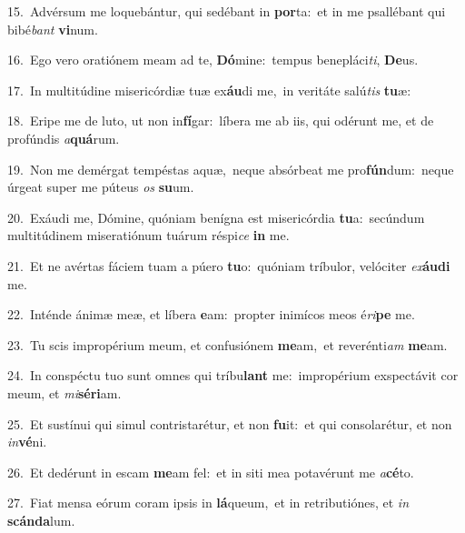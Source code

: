 {\numbfont\textcolor{\numbcolor}{15.}}~Advérsum me loquebántur, qui sedébant in \textbf{por}\-ta:~\star et in me psallébant qui bibé\textit{bant} \textbf{vi}\-num.\par
{\numbfont\textcolor{\numbcolor}{16.}}~Ego vero oratiónem meam ad te, \textbf{Dó}\-mine:~\star tempus benepláci\-\textit{ti}\-, \textbf{De}\-us.\par
{\numbfont\textcolor{\numbcolor}{17.}}~In multitúdine misericórdiæ tuæ ex\-\textbf{áu}\-di me,~\star in veritáte salú\textit{tis} \textbf{tu}\-æ:\par
{\numbfont\textcolor{\numbcolor}{18.}}~Eripe me de luto, ut non in\-\textbf{fí}\-gar:~\star líbera me ab iis, qui odérunt me, et de profúndis \textit{a}\-\textbf{quá}rum.\par
{\numbfont\textcolor{\numbcolor}{19.}}~Non me demérgat tempéstas aquæ,~\dagger neque absórbeat me pro\-\textbf{fún}\-dum:~\star neque úrgeat super me púteus \textit{os} \textbf{su}\-um.\par
{\numbfont\textcolor{\numbcolor}{20.}}~Exáudi me, Dómine, quóniam benígna est misericórdia \textbf{tu}\-a:~\star secúndum multitúdinem miseratiónum tuárum réspi\textit{ce} \textbf{in} me.\par
{\numbfont\textcolor{\numbcolor}{21.}}~Et ne avértas fáciem tuam a púero \textbf{tu}\-o:~\star quóniam tríbulor, velóciter \textit{ex}\-\textbf{áu}\textbf{di} me.\par
{\numbfont\textcolor{\numbcolor}{22.}}~Inténde ánimæ meæ, et líbera \textbf{e}\-am:~\star propter inimícos meos é\-\textit{ri}\-\textbf{pe} me.\par
{\numbfont\textcolor{\numbcolor}{23.}}~Tu scis impropérium meum, et confusiónem \textbf{me}\-am,~\star et reverénti\textit{am} \textbf{me}\-am.\par
{\numbfont\textcolor{\numbcolor}{24.}}~In conspéctu tuo sunt omnes qui tríbu\textbf{lant} me:~\star impropérium exspectávit cor meum, et \textit{mi}\-\textbf{sé}\textbf{ri}am.\par
{\numbfont\textcolor{\numbcolor}{25.}}~Et sustínui qui simul contristarétur, et non \textbf{fu}\-it:~\star et qui consolarétur, et non \textit{in}\-\textbf{vé}ni.\par
{\numbfont\textcolor{\numbcolor}{26.}}~Et dedérunt in escam \textbf{me}\-am fel:~\star et in siti mea potavérunt me \textit{a}\-\textbf{cé}to.\par
{\numbfont\textcolor{\numbcolor}{27.}}~Fiat mensa eórum coram ipsis in \textbf{lá}\-queum,~\star et in retributiónes, et \textit{in} \textbf{scán}\-\textbf{da}lum.\par
